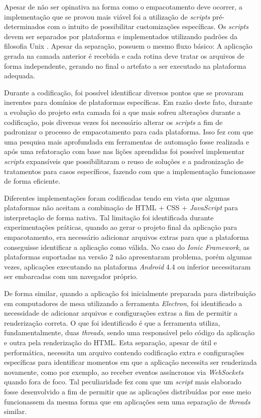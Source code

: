 Apesar de não ser opinativa na forma como o empacotamento deve ocorrer, a implementação que se provou mais viável foi a utilização de \textit{scripts} pré-determinados com o intuito de possibilitar customizações específicas. Os \textit{scripts} devem ser separados por plataforma e implementados utilizando padrões da filosofia Unix \cite{unixPhilosophy}. Apesar da separação, possuem o mesmo fluxo básico: A aplicação gerada na camada anterior é recebida e cada rotina deve tratar os arquivos de forma independente, gerando no final o artefato a ser executado na plataforma adequada.

Durante a codificação, foi possível identificar diversos pontos que se provaram inerentes para domínios de plataformas específicas. Em razão deste fato, durante a evolução do projeto esta camada foi a que mais sofreu alterações durante a codificação, pois diversas vezes foi necessário alterar os \textit{scripts} a fim de padronizar o processo de empacotamento para cada plataforma. Isso fez com que uma pesquisa mais aprofundada em ferramentas de automação fosse realizada e após uma refatoração com base nas lições aprendidas foi possível implementar \textit{scripts} expansíveis que possibilitaram o reuso de soluções e a padronização de tratamentos para casos específicos, fazendo com que a implementação funcionasse de forma eficiente.

Diferentes implementações foram codificadas tendo em vista que algumas plataformas não aceitam a combinação de HTML + CSS + \textit{JavaScript} para interpretação de forma nativa. Tal limitação foi identificada durante experimentações práticas, quando ao gerar o projeto final da aplicação para empacotamento, era necessário adicionar arquivos extras para que a plataforma conseguisse identificar a aplicação como válida. No caso do \textit{Ionic Framework}, as plataformas suportadas na versão 2 não apresentaram problema, porém algumas vezes, aplicações executando na plataforma \textit{Android} 4.4 ou inferior necessitaram ser embarcadas com um navegador próprio.


De forma similar, quando a aplicação foi inicialmente preparada para distribuição em computadores de mesa utilizando a ferramenta \textit{Electron}, foi identificado a necessidade de adicionar arquivos e configurações extras a fim de permitir a renderização correta. O que foi identificado é que a ferramenta utiliza, fundamentalmente, duas \textit{threads}, sendo uma responsável pelo código da aplicação e outra pela renderização do HTML. Esta separação, apesar de útil e performática, necessita um arquivo contendo codificação extra e configurações específicas para identificar momentos em que a aplicação necessita ser renderizada novamente, como por exemplo, ao receber eventos assíncronos via \textit{WebSockets} quando fora de foco. Tal peculiaridade fez com que um \textit{script} mais elaborado fosse desenvolvido a fim de permitir que as aplicações distribuídas por esse meio funcionassem da mesma forma que em aplicações sem uma separação de \textit{threads} similar.

